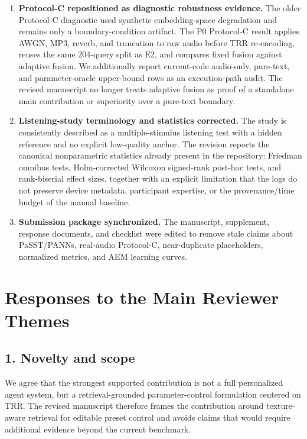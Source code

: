 \documentclass[11pt,a4paper]{article}
\begin{document}
\begin{enumerate}[leftmargin=2em]
    \item \textbf{Protocol-C repositioned as diagnostic robustness evidence.} The older Protocol-C diagnostic used synthetic embedding-space degradation and remains only a boundary-condition artifact. The P0 Protocol-C result applies AWGN, MP3, reverb, and truncation to raw audio before TRR re-encoding, reuses the same 204-query split as E2, and compares fixed fusion against adaptive fusion. We additionally report current-code audio-only, pure-text, and parameter-oracle upper-bound rows as an execution-path audit. The revised manuscript no longer treats adaptive fusion as proof of a standalone main contribution or superiority over a pure-text boundary.

    \item \textbf{Listening-study terminology and statistics corrected.} The study is consistently described as a multiple-stimulus listening test with a hidden reference and no explicit low-quality anchor. The revision reports the canonical nonparametric statistics already present in the repository: Friedman omnibus tests, Holm-corrected Wilcoxon signed-rank post-hoc tests, and rank-biserial effect sizes, together with an explicit limitation that the logs do not preserve device metadata, participant expertise, or the provenance/time budget of the manual baseline.

    \item \textbf{Submission package synchronized.} The manuscript, supplement, response documents, and checklist were edited to remove stale claims about PaSST/PANNs, real-audio Protocol-C, near-duplicate placeholders, normalized metrics, and AEM learning curves.
\end{enumerate}

\section*{Responses to the Main Reviewer Themes}

\subsection*{1. Novelty and scope}

We agree that the strongest supported contribution is not a full personalized agent system, but a retrieval-grounded parameter-control formulation centered on TRR. The revised manuscript therefore frames the contribution around texture-aware retrieval for editable preset control and avoids claims that would require additional evidence beyond the current benchmark.
\end{document}
